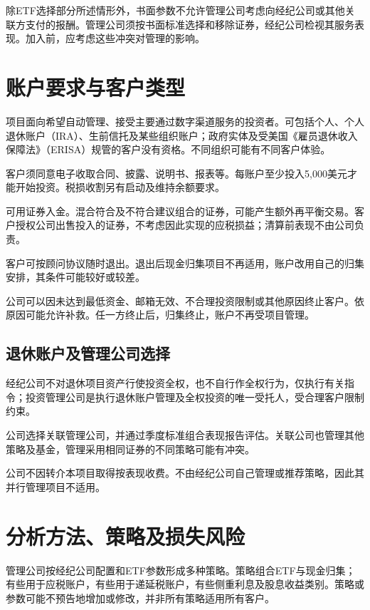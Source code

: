 \documentclass[UTF8,fontset=none,11pt,a4paper]{ctexart}
\begin{document}
除ETF选择部分所述情形外，书面参数不允许管理公司考虑向经纪公司或其他关联方支付的报酬。管理公司须按书面标准选择和移除证券，经纪公司检视其服务表现。加入前，应考虑这些冲突对管\allowbreak\mbox{理的影响。}


\section*{账户要求与客户类型}
项目面向希望自动管理、接受主要通过数字渠道服务的投资者。可包括个人、个人退休账户（IRA）、生前信托及某些组织账户；政府实体及受美国《雇员退休收入保障法》（ERISA）规管的客户没有资格。不同组织可能有不同客\allowbreak\mbox{户体验。}


客户须同意电子收取合同、披露、说明书、报表等。每账户至少投入5,000美元才能开始投资。税损收割另有启动及维持\allowbreak\mbox{余额要求。}


可用证券入金。混合符合及不符合建议组合的证券，可能产生额外再平衡交易。客户授权公司出售投入的证券，不考虑因此实现的应税损益；清算前表现不由\allowbreak\mbox{公司负责。}


客户可按顾问协议随时退出。退出后现金归集项目不再适用，账户改用自己的归集安排，其条件可能较\allowbreak\mbox{好或较差。}


公司可以因未达到最低资金、邮箱无效、不合理投资限制或其他原因终止客户。依原因可能允许补救。任一方终止后，归集终止，账户不再受\allowbreak\mbox{项目管理。}


\subsection*{退休账户及管理公司选择}
经纪公司不对退休项目资产行使投资全权，也不自行作全权行为，仅执行有关指令；投资管理公司是执行退休账户管理及全权投资的唯一受托人，受合理客户\allowbreak\mbox{限制约束。}


公司选择关联管理公司，并通过季度标准组合表现报告评估。关联公司也管理其他策略及基金，管理采用相同证券的不同策略可\allowbreak\mbox{能有冲突。}


公司不因转介本项目取得按表现收费。不由经纪公司自己管理或推荐策略，因此其并行管理项\allowbreak\mbox{目不适用。}


\section*{分析方法、策略及损失风险}
管理公司按经纪公司配置和ETF参数形成多种策略。策略组合ETF与现金归集；有些用于应税账户，有些用于递延税账户，有些侧重利息及股息收益类别。策略或参数可能不预告地增加或修改，并非所有策略适用\allowbreak\mbox{所有客户。}
\end{document}
